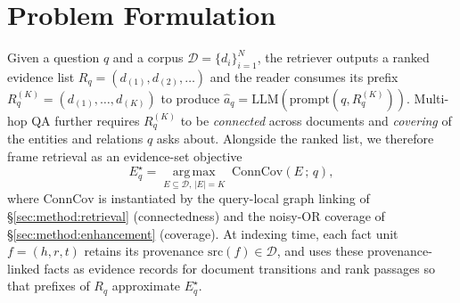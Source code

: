 %
%

\section{Problem Formulation}
\label{sec:problem}

Given a question $q$ and a corpus $\mathcal{D}=\{d_i\}_{i=1}^{N}$,
the retriever outputs a ranked evidence list
$R_q=(d_{(1)},d_{(2)},\ldots)$ and the reader consumes its prefix
$R_q^{(K)}=(d_{(1)},\ldots,d_{(K)})$ to produce
$\hat{a}_q=\mathrm{LLM}(\mathrm{prompt}(q,R_q^{(K)}))$. Multi-hop
QA further requires $R_q^{(K)}$ to be \emph{connected} across
documents and \emph{covering} of the entities and relations $q$
asks about. Alongside the ranked list, we therefore frame
retrieval as an evidence-set objective
\begin{equation}
\label{eq:evidence-set}
E_q^{\star}
=
\operatorname*{arg\,max}_{E \subseteq \mathcal{D},\,|E|=K}
\;\mathrm{ConnCov}(E\,;\,q),
\end{equation}
where $\mathrm{ConnCov}$ is instantiated by the query-local graph
linking of \S\ref{sec:method:retrieval} (connectedness) and the
noisy-OR coverage of \S\ref{sec:method:enhancement} (coverage). At
indexing time, each fact unit $f=(h,r,t)$ retains its provenance
$\mathrm{src}(f)\in\mathcal{D}$, and \methodname{} uses these
provenance-linked facts as evidence records for document transitions and rank
passages so that prefixes of $R_q$
approximate $E_q^{\star}$.
